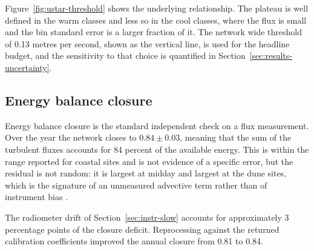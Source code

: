 Figure~\ref{fig:ustar-threshold} shows the underlying relationship. The plateau
is well defined in the warm classes and less so in the cool classes, where the
flux is small and the bin standard error is a larger fraction of it. The
network wide threshold of 0.13 metres per second, shown as the vertical line, is
used for the headline budget, and the sensitivity to that choice is quantified
in Section~\ref{sec:results-uncertainty}.

\subsection{Energy balance closure}
\label{sec:qc-closure}

Energy balance closure is the standard independent check on a flux measurement.
Over the year the network closes to $0.84 \pm 0.03$, meaning that the sum of the
turbulent fluxes accounts for 84 percent of the available energy. This is within
the range reported for coastal sites and is not evidence of a specific error,
but the residual is not random: it is largest at midday and largest at the dune
sites, which is the signature of an unmeasured advective term rather than of
instrument bias \citep{ridley2019closure}.

The radiometer drift of Section~\ref{sec:instr-slow} accounts for approximately
3 percentage points of the closure deficit. Reprocessing against the returned
calibration coefficients improved the annual closure from 0.81 to 0.84.
